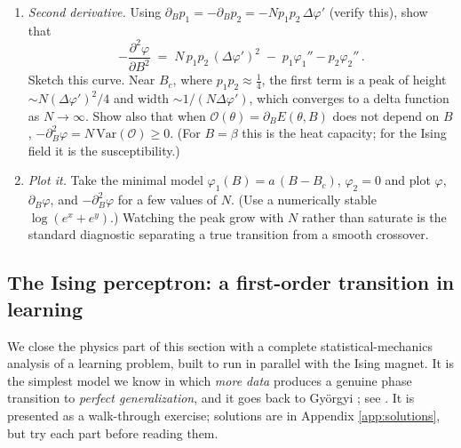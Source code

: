 \documentclass[11pt]{article}
\newcommand{\CO}{{\mathcal O}}
\newcommand{\pd}{\partial}
\begin{document}
\begin{exercise}
\begin{enumerate}
    \item \emph{Second derivative.} Using $\pd_B p_1 = -\pd_B p_2 = -N p_1p_2\,\Delta\varphi'$ (verify this), show that
    \begin{equation} \label{chi-peak}
        -\frac{\pd^2\varphi}{\pd B^2} \;=\; N\,p_1p_2\,(\Delta\varphi')^2 \;-\; p_1\varphi_1'' - p_2\varphi_2''\,.
    \end{equation}
    Sketch this curve. Near $B_c$, where $p_1p_2\approx\frac{1}{4}$, the first term is a peak of height $\sim N(\Delta\varphi')^2/4$ and width $\sim 1/(N\Delta\varphi')$, which converges to a delta function as $N\to\infty$. Show also that when $\CO(\theta) = \pd_BE(\theta,B)$ does not depend on $B$, $-\pd_B^2\varphi = N\,\mathrm{Var}(\CO)\geq 0$. (For $B=\beta$ this is the heat capacity; for the Ising field it is the susceptibility.)
    \item \emph{Plot it.} Take the minimal model $\varphi_1(B) = a\,(B-B_c)$, $\varphi_2 = 0$ and plot $\varphi$, $\pd_B\varphi$, and $-\pd_B^2\varphi$ for a few values of $N$. (Use a numerically stable $\log(e^x+e^y)$.) Watching the peak grow with $N$ rather than saturate is the standard diagnostic separating a true transition from a smooth crossover.
\end{enumerate}
\end{exercise}

\subsection{The Ising perceptron: a first-order transition in learning}
\label{sec:ising}

We close the physics part of this section with a complete statistical-mechanics analysis of a learning problem, built to run in parallel with the Ising magnet. It is the simplest model we know in which \emph{more data} produces a genuine phase transition to \emph{perfect generalization}, and it goes back to Gy\"orgyi \cite{gyorgyi1990first}; see \cite[Chapter 7]{engel2001statistical}. It is presented as a walk-through exercise; solutions are in Appendix \ref{app:solutions}, but try each part before reading them.
\end{document}
